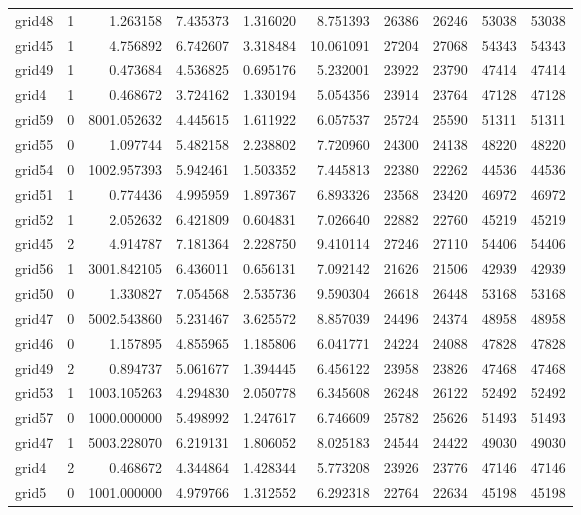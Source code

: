 \begin{longtable}{|l|r|r|r|r|r|r|r|r|r|}
grid48 & 1 & 1.263158 & 7.435373 & 1.316020 & 8.751393 & 26386 & 26246 & 53038 & 53038 \\
grid45 & 1 & 4.756892 & 6.742607 & 3.318484 & 10.061091 & 27204 & 27068 & 54343 & 54343 \\
grid49 & 1 & 0.473684 & 4.536825 & 0.695176 & 5.232001 & 23922 & 23790 & 47414 & 47414 \\
grid4 & 1 & 0.468672 & 3.724162 & 1.330194 & 5.054356 & 23914 & 23764 & 47128 & 47128 \\
grid59 & 0 & 8001.052632 & 4.445615 & 1.611922 & 6.057537 & 25724 & 25590 & 51311 & 51311 \\
grid55 & 0 & 1.097744 & 5.482158 & 2.238802 & 7.720960 & 24300 & 24138 & 48220 & 48220 \\
grid54 & 0 & 1002.957393 & 5.942461 & 1.503352 & 7.445813 & 22380 & 22262 & 44536 & 44536 \\
grid51 & 1 & 0.774436 & 4.995959 & 1.897367 & 6.893326 & 23568 & 23420 & 46972 & 46972 \\
grid52 & 1 & 2.052632 & 6.421809 & 0.604831 & 7.026640 & 22882 & 22760 & 45219 & 45219 \\
grid45 & 2 & 4.914787 & 7.181364 & 2.228750 & 9.410114 & 27246 & 27110 & 54406 & 54406 \\
grid56 & 1 & 3001.842105 & 6.436011 & 0.656131 & 7.092142 & 21626 & 21506 & 42939 & 42939 \\
grid50 & 0 & 1.330827 & 7.054568 & 2.535736 & 9.590304 & 26618 & 26448 & 53168 & 53168 \\
grid47 & 0 & 5002.543860 & 5.231467 & 3.625572 & 8.857039 & 24496 & 24374 & 48958 & 48958 \\
grid46 & 0 & 1.157895 & 4.855965 & 1.185806 & 6.041771 & 24224 & 24088 & 47828 & 47828 \\
grid49 & 2 & 0.894737 & 5.061677 & 1.394445 & 6.456122 & 23958 & 23826 & 47468 & 47468 \\
grid53 & 1 & 1003.105263 & 4.294830 & 2.050778 & 6.345608 & 26248 & 26122 & 52492 & 52492 \\
grid57 & 0 & 1000.000000 & 5.498992 & 1.247617 & 6.746609 & 25782 & 25626 & 51493 & 51493 \\
grid47 & 1 & 5003.228070 & 6.219131 & 1.806052 & 8.025183 & 24544 & 24422 & 49030 & 49030 \\
grid4 & 2 & 0.468672 & 4.344864 & 1.428344 & 5.773208 & 23926 & 23776 & 47146 & 47146 \\
grid5 & 0 & 1001.000000 & 4.979766 & 1.312552 & 6.292318 & 22764 & 22634 & 45198 & 45198 \\

\end{longtable}

